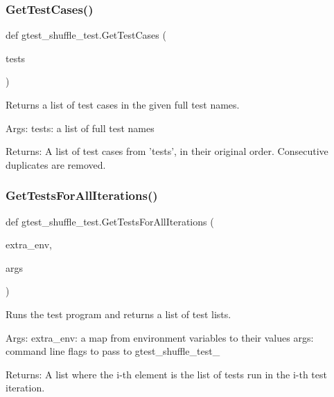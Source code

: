 \mbox{\label{namespacegtest__shuffle__test_af5328e9cbee0e357d6abf16255df13f7}} 
\subsubsection{\texorpdfstring{Get\+Test\+Cases()}{GetTestCases()}}
{\footnotesize\ttfamily def gtest\+\_\+shuffle\+\_\+test.\+Get\+Test\+Cases (\begin{DoxyParamCaption}\item[{}]{tests }\end{DoxyParamCaption})}

\begin{DoxyVerb}Returns a list of test cases in the given full test names.

Args:
  tests: a list of full test names

Returns:
  A list of test cases from 'tests', in their original order.
  Consecutive duplicates are removed.
\end{DoxyVerb}
 \mbox{\label{namespacegtest__shuffle__test_a18c7606bf0d41acb73a4a6a2994d36fc}} 
\subsubsection{\texorpdfstring{Get\+Tests\+For\+All\+Iterations()}{GetTestsForAllIterations()}}
{\footnotesize\ttfamily def gtest\+\_\+shuffle\+\_\+test.\+Get\+Tests\+For\+All\+Iterations (\begin{DoxyParamCaption}\item[{}]{extra\+\_\+env,  }\item[{}]{args }\end{DoxyParamCaption})}

\begin{DoxyVerb}Runs the test program and returns a list of test lists.

Args:
  extra_env: a map from environment variables to their values
  args: command line flags to pass to gtest_shuffle_test_

Returns:
  A list where the i-th element is the list of tests run in the i-th
  test iteration.
\end{DoxyVerb}
 \mbox{\label{namespacegtest__shuffle__test_aaf2a94c748f266c4267ac7e7bb3451fd}} 
